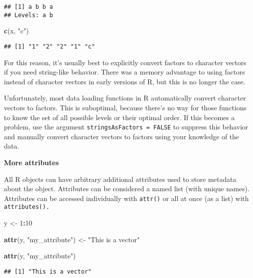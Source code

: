 \documentclass[
]{book}
\newenvironment{Shaded}{\begin{snugshade}}{\end{snugshade}}
\newcommand{\DecValTok}[1]{\textcolor[rgb]{0.00,0.00,0.81}{#1}}
\newcommand{\KeywordTok}[1]{\textcolor[rgb]{0.13,0.29,0.53}{\textbf{#1}}}
\newcommand{\NormalTok}[1]{#1}
\newcommand{\OperatorTok}[1]{\textcolor[rgb]{0.81,0.36,0.00}{\textbf{#1}}}
\newcommand{\StringTok}[1]{\textcolor[rgb]{0.31,0.60,0.02}{#1}}
\begin{document}
\begin{verbatim}
## [1] a b b a
## Levels: a b
\end{verbatim}

\begin{Shaded}
\begin{Highlighting}[]
\KeywordTok{c}\NormalTok{(x, }\StringTok{"c"}\NormalTok{)}
\end{Highlighting}
\end{Shaded}

\begin{verbatim}
## [1] "1" "2" "2" "1" "c"
\end{verbatim}

For this reason, it's usually best to explicitly convert factors to character vectors if you need string-like behavior. There was a memory advantage to using factors instead of character vectors in early versions of R, but this is no longer the case.

Unfortunately, most data loading functions in R automatically convert character vectors to factors. This is suboptimal, because there's no way for those functions to know the set of all possible levels or their optimal order. If this becomes a problem, use the argument \texttt{stringsAsFactors\ =\ FALSE} to suppress this behavior and manually convert character vectors to factors using your knowledge of the data.

\textbf{More attributes}

All R objects can have arbitrary additional attributes used to store metadata about the object. Attributes can be considered a named list (with unique names). Attributes can be accessed individually with \texttt{attr()} or all at once (as a list) with \texttt{attributes().}

\begin{Shaded}
\begin{Highlighting}[]
\NormalTok{y \textless{}{-}}\StringTok{ }\DecValTok{1}\OperatorTok{:}\DecValTok{10}

\KeywordTok{attr}\NormalTok{(y, }\StringTok{"my\_attribute"}\NormalTok{) \textless{}{-}}\StringTok{ "This is a vector"}

\KeywordTok{attr}\NormalTok{(y, }\StringTok{"my\_attribute"}\NormalTok{)}
\end{Highlighting}
\end{Shaded}

\begin{verbatim}
## [1] "This is a vector"
\end{verbatim}
\end{document}
